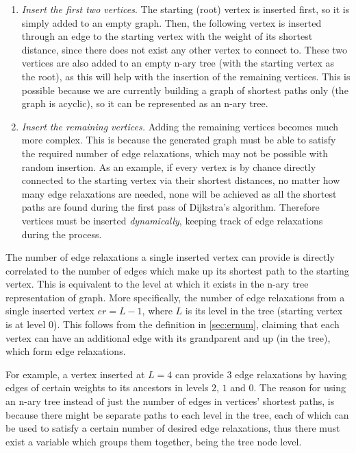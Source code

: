 \documentclass{l4proj}
\begin{document}
\begin{enumerate}[i]
	\item
	\emph{Insert the first two vertices}. The starting (root) vertex is inserted first, so it is simply added to an empty graph. Then, the following vertex is inserted through an edge to the starting vertex with the weight of its shortest distance, since there does not exist any other vertex to connect to. These two vertices are also added to an empty n-ary tree (with the starting vertex as the root), as this will help with the insertion of the remaining vertices. This is possible because we are currently building a graph of shortest paths only (the graph is acyclic), so it can be represented as an n-ary tree.
	\item
	\emph{Insert the remaining vertices.} Adding the remaining vertices becomes much more complex. This is because the generated graph must be able to satisfy the required number of edge relaxations, which may not be possible with random insertion. As an example, if every vertex is by chance directly connected to the starting vertex via their shortest distances, no matter how many edge relaxations are needed, none will be achieved as all the shortest paths are found during the first pass of Dijkstra's algorithm. Therefore vertices must be inserted \emph{dynamically}, keeping track of edge relaxations during the process.
\end{enumerate}

The number of edge relaxations a single inserted vertex can provide is directly correlated to the number of edges which make up its shortest path to the starting vertex. This is equivalent to the level at which it exists in the n-ary tree representation of graph. More specifically, the number of edge relaxations from a single inserted vertex $er = L-1$, where $L$ is its level in the tree (starting vertex is at level $0$). This follows from the definition in \autoref{sec:ernum}, claiming that each vertex can have an additional edge with its grandparent and up (in the tree), which form edge relaxations. 

For example, a vertex inserted at $L=4$ can provide $3$ edge relaxations by having edges of certain weights to its ancestors in levels $2$, $1$ and $0$. The reason for using an n-ary tree instead of just the number of edges in vertices' shortest paths, is because there might be separate paths to each level in the tree, each of which can be used to satisfy a certain number of desired edge relaxations, thus there must exist a variable which groups them together, being the tree node level.
\end{document}
